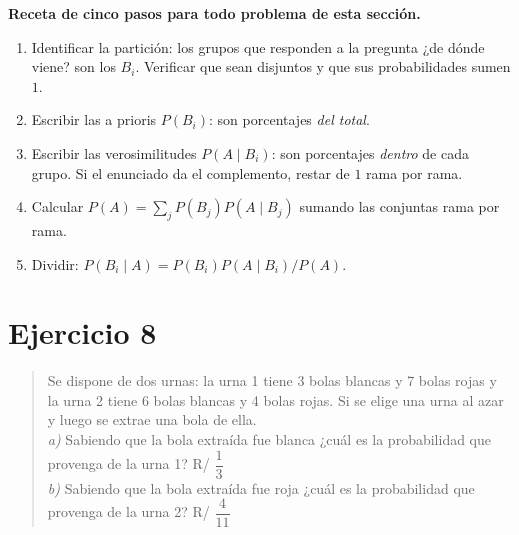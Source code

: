 \documentclass[11pt]{article}
\begin{document}
\begin{reg}
\textbf{Receta de cinco pasos para todo problema de esta sección.}
\begin{enumerate}[leftmargin=*,nosep]
  \item Identificar la partición: los grupos que responden a la pregunta ¿de dónde viene? son los $B_i$. Verificar que sean disjuntos y que sus probabilidades sumen $1$.
  \item Escribir las a prioris $P(B_i)$: son porcentajes \emph{del total}.
  \item Escribir las verosimilitudes $P(A\mid B_i)$: son porcentajes \emph{dentro} de cada grupo. Si el enunciado da el complemento, restar de $1$ rama por rama.
  \item Calcular $P(A)=\sum_j P(B_j)P(A\mid B_j)$ sumando las conjuntas rama por rama.
  \item Dividir: $P(B_i\mid A)=P(B_i)P(A\mid B_i)/P(A)$.
\end{enumerate}
\end{reg}

\newpage
\section*{Ejercicio 8}

\begin{quote}
Se dispone de dos urnas: la urna 1 tiene 3 bolas blancas y 7 bolas rojas y la urna 2 tiene 6 bolas blancas y 4 bolas rojas. Si se elige una urna al azar y luego se extrae una bola de ella.\\
\emph{a)} Sabiendo que la bola extraída fue blanca ¿cuál es la probabilidad que provenga de la urna 1? \hfill R/ $\dfrac13$\\
\emph{b)} Sabiendo que la bola extraída fue roja ¿cuál es la probabilidad que provenga de la urna 2? \hfill R/ $\dfrac{4}{11}$
\end{quote}
\end{document}

